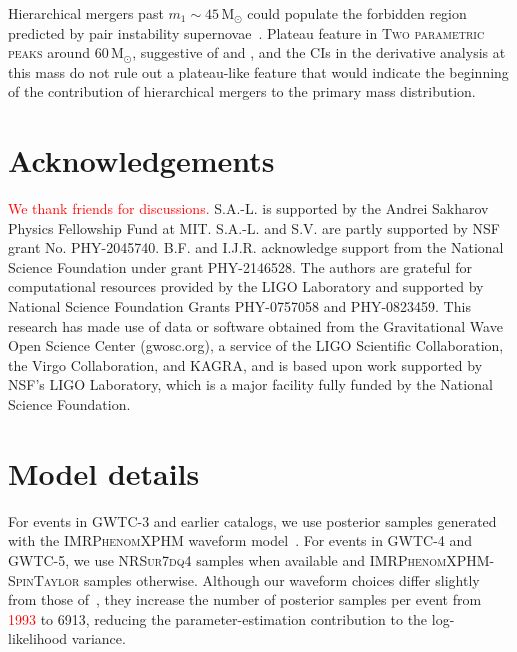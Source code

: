 \documentclass[twocolumn,twocolappendix,linenumbers]{aastex631}
\newcommand{\red}[1]{{\color{Red} #1}}
\newcommand{\twoparpeaks}{\textsc{Two parametric peaks}\xspace}
\newcommand{\Msun}{\ensuremath{\mathrm{M}_\odot}\xspace}
\begin{document}
Hierarchical mergers past \(m_1\sim45\,\Msun\) could populate the forbidden region predicted by pair instability supernovae~\citep{Tong:2025wpz, Antonini:2025ilj}.
Plateau feature in \twoparpeaks around \(60\,\Msun\), suggestive of \cite{Antonini:2024het} and \cite{Antonini:2022vib}, and the CIs in the derivative analysis at this mass do not rule out a plateau-like feature that would indicate the \red{beginning of the contribution of} hierarchical mergers to the primary mass distribution.

\section*{Acknowledgements}
\begin{acknowledgments}
\textcolor{red}{We thank friends for discussions.}
%
S.A.-L. is supported by the Andrei Sakharov Physics Fellowship Fund at MIT. 
%
S.A.-L. and S.V. are partly supported by NSF grant No. PHY-2045740.
%
B.F. and I.J.R. acknowledge support from the National Science Foundation under grant PHY-2146528.
%
The authors are grateful for computational resources provided by the LIGO Laboratory and supported by National Science Foundation Grants PHY-0757058 and PHY-0823459.
%
This research has made use of data or software obtained from the Gravitational Wave Open Science Center (gwosc.org), a service of the LIGO Scientific Collaboration, the Virgo Collaboration, and KAGRA,
%
and is based upon work supported by NSF's LIGO Laboratory, which is a major facility fully funded by the National Science Foundation.
\end{acknowledgments}

\appendix 


\section{Model details}\label{app:model-details}

For events in \acs{GWTC-3} and earlier catalogs, we use posterior samples generated with the \textsc{IMRPhenomXPHM} waveform model~\citep{Pratten:2020ceb}.
For events in \acs{GWTC-4} and \acs{GWTC-5}, we use \textsc{NRSur7dq4} samples when available and \textsc{IMRPhenomXPHM-SpinTaylor} samples otherwise.
Although our waveform choices differ slightly from those of~\citet{LIGOScientific:2026wfs}, they increase the number of posterior samples per event from \textcolor{red}{1993} to 6913, reducing the parameter-estimation contribution to the log-likelihood variance.
\end{document}
